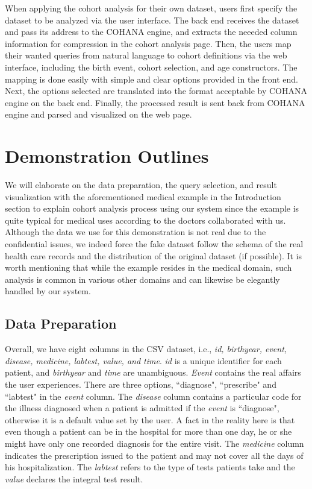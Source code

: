 \documentclass[10pt,conference,letterpaper]{IEEEtran}
\begin{document}
When applying the cohort analysis for their own dataset, users first specify the dataset to be analyzed via the user interface.
The back end receives the dataset and pass its address to the COHANA engine, and extracts the neeeded column information for compression in the cohort analysis page. 
Then, the users map their wanted queries from natural language to cohort definitions via the web interface, including the birth event, cohort selection, and age constructors.
The mapping is done easily with simple and clear options provided in the front end.
Next, the options selected are translated into the format acceptable by COHANA engine on the back end. Finally, the processed result is sent back from COHANA engine and parsed and visualized on the web page.

\section{Demonstration Outlines}

We will elaborate on the data preparation, the query selection, and result visualization with the aforementioned medical example in the Introduction section to explain cohort analysis process using our system since the example is quite typical for medical uses according to the doctors collaborated with us.
Although the data we use for this demonstration is not real due to the confidential issues, we indeed force the fake dataset follow the schema of the real health care records and the distribution of the original dataset (if possible).
It is worth mentioning that while the example resides in the medical domain, such analysis is common in various other domains and can likewise be elegantly handled by our system.

\subsection{Data Preparation}

Overall, we have eight columns in the CSV dataset, i.e., \emph{id, birthyear, event, disease, medicine, labtest, value, and time}. \emph{id} is a unique identifier for each patient, and \emph{birthyear} and \emph{time} are unambiguous. 
\emph{Event} contains the real affairs the user experiences.
There are three options, ``diagnose", ``prescribe" and ``labtest" in the \emph{event} column.
The \emph{disease} column contains a particular code for the illness diagnosed when a patient is admitted if the \emph{event} is ``diagnose", otherwise it is a default value set by the user.
A fact in the reality here is that even though a patient can be in the hospital for more than one day, he or she might have only one recorded diagnosis for the entire visit. 
The \emph{medicine} column indicates the prescription issued to the patient and may not cover all the days of his hospitalization. 
The \emph{labtest} refers to the type of tests patients take and the \emph{value} declares the integral test result. 
\end{document}
